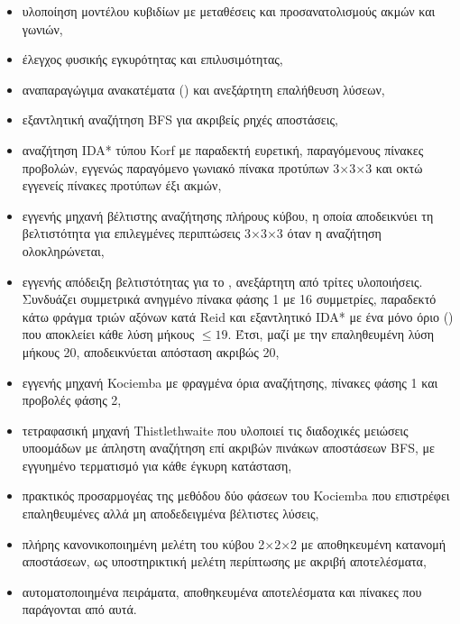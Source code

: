 \begin{itemize}
\item υλοποίηση μοντέλου κυβιδίων με μεταθέσεις και προσανατολισμούς ακμών και γωνιών,
\item έλεγχος φυσικής εγκυρότητας και επιλυσιμότητας,
\item αναπαραγώγιμα ανακατέματα () και ανεξάρτητη επαλήθευση λύσεων,
\item εξαντλητική αναζήτηση BFS για ακριβείς ρηχές αποστάσεις,
\item αναζήτηση IDA* τύπου Korf με παραδεκτή ευρετική, παραγόμενους πίνακες προβολών, εγγενώς παραγόμενο γωνιακό πίνακα προτύπων 3×3×3 και οκτώ εγγενείς πίνακες προτύπων έξι ακμών,
\item εγγενής μηχανή βέλτιστης αναζήτησης πλήρους κύβου, η οποία αποδεικνύει τη βελτιστότητα για επιλεγμένες περιπτώσεις 3×3×3 όταν η αναζήτηση ολοκληρώνεται,
\item εγγενής απόδειξη βελτιστότητας για το , ανεξάρτητη από τρίτες υλοποιήσεις. Συνδυάζει συμμετρικά ανηγμένο πίνακα  φάσης 1 με 16 συμμετρίες, παραδεκτό κάτω φράγμα τριών αξόνων κατά Reid \cite{reid1997optimal} και εξαντλητικό IDA* με ένα μόνο όριο () που αποκλείει κάθε λύση μήκους $\le 19$. Έτσι, μαζί με την επαληθευμένη λύση μήκους 20, αποδεικνύεται απόσταση ακριβώς 20,
\item εγγενής μηχανή Kociemba με φραγμένα όρια αναζήτησης, πίνακες φάσης 1 και προβολές φάσης 2,
\item τετραφασική μηχανή Thistlethwaite που υλοποιεί τις διαδοχικές μειώσεις υποομάδων με άπληστη αναζήτηση επί ακριβών πινάκων αποστάσεων BFS, με εγγυημένο τερματισμό για κάθε έγκυρη κατάσταση,
\item πρακτικός προσαρμογέας της μεθόδου δύο φάσεων του Kociemba που επιστρέφει επαληθευμένες αλλά μη αποδεδειγμένα βέλτιστες λύσεις,
\item πλήρης κανονικοποιημένη μελέτη του κύβου 2×2×2 με αποθηκευμένη κατανομή αποστάσεων, ως υποστηρικτική μελέτη περίπτωσης με ακριβή αποτελέσματα,
\item αυτοματοποιημένα πειράματα, αποθηκευμένα αποτελέσματα και πίνακες που παράγονται από αυτά.
\end{itemize}

